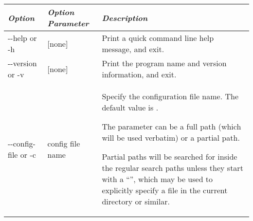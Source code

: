 \begin{longtabu} to \textwidth {l|l|X}\toprule
\emph{Option}         & \emph{Option Parameter} & \emph{Description}\\\midrule
-\/-help or -h        & {[}none{]}       & Print a quick command line help message, and exit. \\\midrule
-\/-version or -v     & {[}none{]}       & Print the program name and version information, and exit. \\\midrule
-\/-config-file or -c & config file name & Specify the configuration file name. The default value is .

The parameter can be a full path (which will be used verbatim) or a partial path.

Partial paths will be searched for inside the regular search paths
unless they start with a ``'', which may be used to explicitly
specify a file in the current directory or similar.


\end{longtabu}
